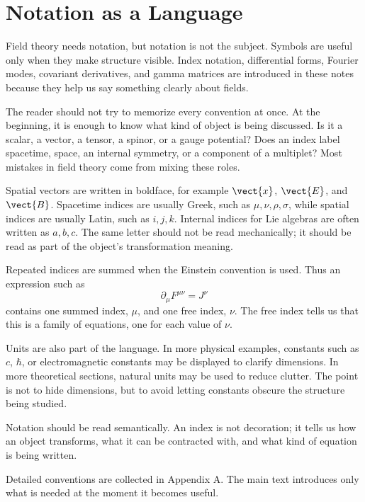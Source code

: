 \section{Notation as a Language}

Field theory needs notation, but notation is not the subject. Symbols are useful
only when they make structure visible. Index notation, differential forms,
Fourier modes, covariant derivatives, and gamma matrices are introduced in these
notes because they help us say something clearly about fields.

The reader should not try to memorize every convention at once. At the beginning,
it is enough to know what kind of object is being discussed. Is it a scalar, a
vector, a tensor, a spinor, or a gauge potential? Does an index label spacetime,
space, an internal symmetry, or a component of a multiplet? Most mistakes in
field theory come from mixing these roles.

Spatial vectors are written in boldface, for example \(\vect{x}\), \(\vect{E}\),
and \(\vect{B}\). Spacetime indices are usually Greek, such as
\(\mu,\nu,\rho,\sigma\), while spatial indices are usually Latin, such as
\(i,j,k\). Internal indices for Lie algebras are often written as \(a,b,c\). The
same letter should not be read mechanically; it should be read as part of the
object's transformation meaning.

Repeated indices are summed when the Einstein convention is used. Thus an
expression such as
\[
    \partial_\mu F^{\mu\nu}=J^\nu
\]
contains one summed index, \(\mu\), and one free index, \(\nu\). The free index
tells us that this is a family of equations, one for each value of \(\nu\).

Units are also part of the language. In more physical examples, constants such
as \(c\), \(\hbar\), or electromagnetic constants may be displayed to clarify
dimensions. In more theoretical sections, natural units may be used to reduce
clutter. The point is not to hide dimensions, but to avoid letting constants
obscure the structure being studied.

\begin{remarkbox}
Notation should be read semantically. An index is not decoration; it tells us how
an object transforms, what it can be contracted with, and what kind of equation
is being written.
\end{remarkbox}

Detailed conventions are collected in Appendix A. The main text introduces only
what is needed at the moment it becomes useful.

